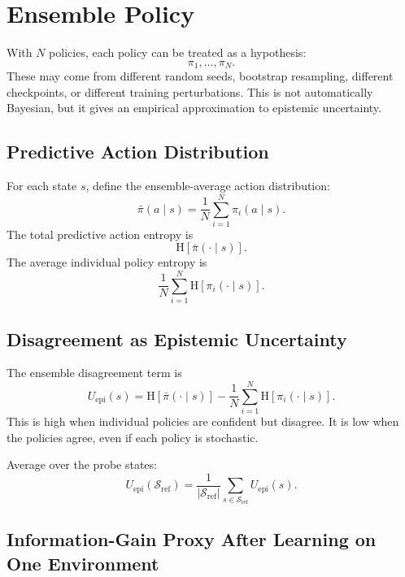 \documentclass[11pt]{article}
\newcommand{\Sref}{\mathcal{S}_{\mathrm{ref}}}
\newcommand{\Hent}{\mathrm{H}}
\begin{document}
\section{Ensemble Policy}

With $N$ policies, each policy can be treated as a hypothesis:
\begin{equation}
  \pi_1,\ldots,\pi_N.
\end{equation}
These may come from different random seeds, bootstrap resampling, different
checkpoints, or different training perturbations. This is not automatically
Bayesian, but it gives an empirical approximation to epistemic uncertainty.

\subsection{Predictive Action Distribution}

For each state $s$, define the ensemble-average action distribution:
\begin{equation}
  \bar{\pi}(a \mid s)
  =
  \frac{1}{N}\sum_{i=1}^{N}\pi_i(a \mid s).
\end{equation}
The total predictive action entropy is
\begin{equation}
  \Hent[\bar{\pi}(\cdot \mid s)].
\end{equation}
The average individual policy entropy is
\begin{equation}
  \frac{1}{N}\sum_{i=1}^{N}\Hent[\pi_i(\cdot \mid s)].
\end{equation}

\subsection{Disagreement as Epistemic Uncertainty}

The ensemble disagreement term is
\begin{equation}
  U_{\mathrm{epi}}(s)
  =
  \Hent[\bar{\pi}(\cdot \mid s)]
  -
  \frac{1}{N}\sum_{i=1}^{N}\Hent[\pi_i(\cdot \mid s)].
\end{equation}
This is high when individual policies are confident but disagree. It is low
when the policies agree, even if each policy is stochastic.

Average over the probe states:
\begin{equation}
  U_{\mathrm{epi}}(\Sref)
  =
  \frac{1}{|\Sref|}\sum_{s \in \Sref}U_{\mathrm{epi}}(s).
\end{equation}

\subsection{Information-Gain Proxy After Learning on One Environment}
\end{document}
